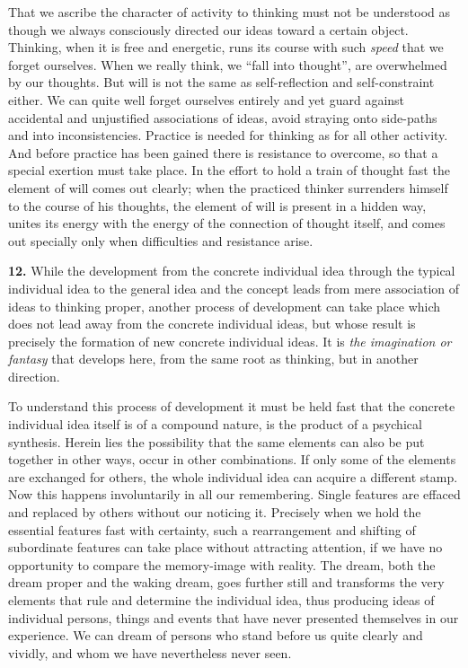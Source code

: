 \documentclass[12pt,a4paper]{book}
\newcommand{\opage}[1]{\marginnote{\footnotesize\textit{[#1]}}}
\begin{document}
That we ascribe the character of activity to thinking must not be
understood as though we always consciously directed our ideas toward a
certain object. Thinking, when it is free and energetic, runs its course
with such \emph{speed} that we
\opage{221}forget ourselves. When we really think, we ``fall into
thought'', are overwhelmed by our thoughts. But will is not the same as
self-reflection and self-constraint either. We can quite well forget
ourselves entirely and yet guard against accidental and unjustified
associations of ideas, avoid straying onto side-paths and into
inconsistencies. Practice is needed for thinking as for all other
activity. And before practice has been gained there is resistance to
overcome, so that a special exertion must take place. In the effort to
hold a train of thought fast the element of will comes out clearly; when
the practiced thinker surrenders himself to the course of his thoughts,
the element of will is present in a hidden way, unites its energy with
the energy of the connection of thought itself, and comes out specially
only when difficulties and resistance arise.

\textbf{12.} While the development from the concrete individual idea
through the typical individual idea to the general idea and the concept
leads from mere association of ideas to thinking proper, another process
of development can take place which does not lead away from the concrete
individual ideas, but whose result is precisely the formation of new
concrete individual ideas. It is \emph{the imagination or fantasy} that
develops here, from the same root as thinking, but in another direction.

To understand this process of development it must be held fast that the
concrete individual idea itself is of a compound nature, is the product
of a psychical synthesis. Herein lies the possibility that the same
elements can also be put together in other ways, occur in other
combinations. If only some of the elements are exchanged for others, the
whole individual idea can acquire a different stamp. Now this happens
involuntarily in all our remembering. Single features are effaced and
replaced by others without our noticing it. Precisely when we hold the
essential features fast with certainty, such a rearrangement and
shifting of subordinate features can take place without attracting
attention, if we have no opportunity to compare the memory-image with
reality. The dream, both the dream proper and the waking dream, goes
further still and transforms the very elements that rule and determine
the individual idea, thus producing ideas of
\opage{222}individual persons, things and events that have never
presented themselves in our experience. We can dream of persons who
stand before us quite clearly and vividly, and whom we have nevertheless
never seen.
\end{document}

